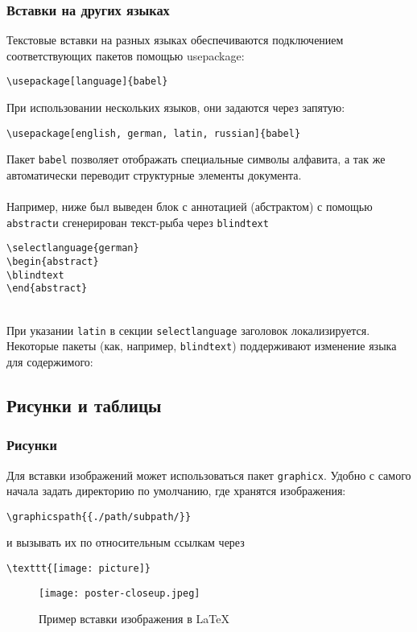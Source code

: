 \documentclass[a4paper]{article}
\newcommand{\cbox}[2][green]{%
  \colorbox{#1}{\parbox{\dimexpr\linewidth-2\fboxsep}{#2}}%
}
\begin{document}
\thispagestyle{empty}

\newpage
\subsubsection{Вставки на других языках}
Текстовые вставки на разных языках обеспечиваются подключением соответствующих пакетов помощью usepackage:
\begin{lstlisting}
\usepackage[language]{babel}
\end{lstlisting}

При использовании нескольких языков, они задаются через запятую:
\begin{lstlisting}
\usepackage[english, german, latin, russian]{babel}
\end{lstlisting}\hfill\break
Пакет \lstinline{babel} позволяет отображать специальные символы алфавита, а так же автоматически переводит структурные элементы документа. \\\\
Например, ниже был выведен блок с аннотацией (абстрактом) с помощью \lstinline{abstract}и сгенерирован текст-рыба через \lstinline{blindtext} 
\begin{lstlisting}
\selectlanguage{german}
\begin{abstract}
\blindtext
\end{abstract}
\end{lstlisting}
\cbox[lightgray!20]{
	\begin{abstract}
		\blindtext
	\end{abstract}
}
 \\
При указании \lstinline{latin} в секции \lstinline{selectlanguage} заголовок локализируется. Некоторые пакеты (как, например, \lstinline{blindtext}) поддерживают изменение языка для содержимого:\\
\cbox[lightgray!20]{
	\begin{abstract}
		\blindtext
	\end{abstract}
}
\thispagestyle{empty}

\newpage
\subsection{Рисунки и таблицы}
\subsubsection{Рисунки}
Для вставки изображений может использоваться пакет \lstinline{graphicx}.
Удобно с самого начала задать директорию по умолчанию, где хранятся изображения:
\begin{lstlisting} 
\graphicspath{{./path/subpath/}} 
\end{lstlisting}
и вызывать их по относительным ссылкам через
\begin{lstlisting} 
\texttt{[image: picture]}
\end{lstlisting} 
\begin{figure}[h]
	\centering
	\texttt{[image: poster-closeup.jpeg]}
	\caption{Пример вставки изображения в \LaTeX}
	\label{fig:mesh1}
\end{figure}
\end{document}
